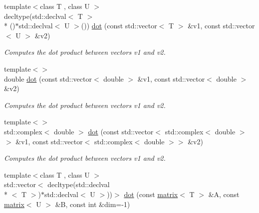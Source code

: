 \begin{DoxyCompactItemize}
\item 
\hypertarget{namespacekeycpp_af2f586b97047513a6d2fa346d2302af0}{{\footnotesize template$<$class T , class U $>$ }\\decltype(std\-::declval$<$ T $>$\\*
()$\ast$std\-::declval$<$ U $>$()) \hyperlink{namespacekeycpp_af2f586b97047513a6d2fa346d2302af0}{dot} (const std\-::vector$<$ T $>$ \&v1, const std\-::vector$<$ U $>$ \&v2)}\label{namespacekeycpp_af2f586b97047513a6d2fa346d2302af0}

\begin{DoxyCompactList}\small\item\em Computes the dot product between vectors v1 and v2. \end{DoxyCompactList}\item 
\hypertarget{namespacekeycpp_ad14584bb6e102379fb176e7a864c9cf8}{{\footnotesize template$<$$>$ }\\double \hyperlink{namespacekeycpp_ad14584bb6e102379fb176e7a864c9cf8}{dot} (const std\-::vector$<$ double $>$ \&v1, const std\-::vector$<$ double $>$ \&v2)}\label{namespacekeycpp_ad14584bb6e102379fb176e7a864c9cf8}

\begin{DoxyCompactList}\small\item\em Computes the dot product between vectors v1 and v2. \end{DoxyCompactList}\item 
\hypertarget{namespacekeycpp_af4148cd818cee05304763a197bf56e3c}{{\footnotesize template$<$$>$ }\\std\-::complex$<$ double $>$ \hyperlink{namespacekeycpp_af4148cd818cee05304763a197bf56e3c}{dot} (const std\-::vector$<$ std\-::complex$<$ double $>$$>$ \&v1, const std\-::vector$<$ std\-::complex$<$ double $>$$>$ \&v2)}\label{namespacekeycpp_af4148cd818cee05304763a197bf56e3c}

\begin{DoxyCompactList}\small\item\em Computes the dot product between vectors v1 and v2. \end{DoxyCompactList}\item 
\hypertarget{namespacekeycpp_ac3f44dfd7e58788078a8cba3696d3a39}{{\footnotesize template$<$class T , class U $>$ }\\std\-::vector$<$ decltype(std\-::declval\\*
$<$ T $>$)$\ast$std\-::declval$<$ U $>$))$>$ \hyperlink{namespacekeycpp_ac3f44dfd7e58788078a8cba3696d3a39}{dot} (const \hyperlink{classkeycpp_1_1matrix}{matrix}$<$ T $>$ \&A, const \hyperlink{classkeycpp_1_1matrix}{matrix}$<$ U $>$ \&B, const int \&dim=-\/1)}\label{namespacekeycpp_ac3f44dfd7e58788078a8cba3696d3a39}


\end{DoxyCompactItemize}
